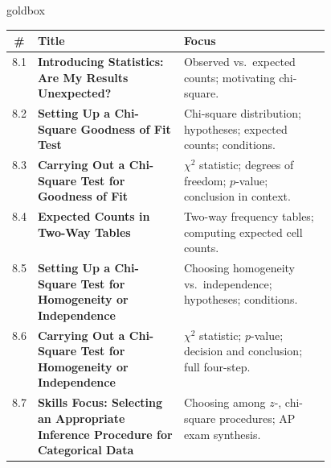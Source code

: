 \documentclass[10pt]{article}
\begin{document}
\renewcommand{\arraystretch}{1.35}
\begin{skillbox}{goldbox}
\small
\begin{tabularx}{\linewidth}{@{} c >{\bfseries}p{0.46\linewidth} X @{}}
  \textbf{\#} & \textbf{Title} & \textbf{Focus} \\
  \hline
  8.1 & Introducing Statistics: Are My Results Unexpected?
      & Observed vs.\ expected counts; motivating chi-square. \\
  \hline
  8.2 & Setting Up a Chi-Square Goodness of Fit Test
      & Chi-square distribution; hypotheses; expected counts; conditions. \\
  \hline
  8.3 & Carrying Out a Chi-Square Test for Goodness of Fit
      & $\chi^2$ statistic; degrees of freedom; $p$-value; conclusion in context. \\
  \hline
  8.4 & Expected Counts in Two-Way Tables
      & Two-way frequency tables; computing expected cell counts. \\
  \hline
  8.5 & Setting Up a Chi-Square Test for Homogeneity or Independence
      & Choosing homogeneity vs.\ independence; hypotheses; conditions. \\
  \hline
  8.6 & Carrying Out a Chi-Square Test for Homogeneity or Independence
      & $\chi^2$ statistic; $p$-value; decision and conclusion; full four-step. \\
  \hline
  8.7 & Skills Focus: Selecting an Appropriate Inference Procedure for Categorical Data
      & Choosing among $z$-, chi-square procedures; AP exam synthesis. \\
  \hline
\end{tabularx}
\end{skillbox}

\vspace{0.12in}
\end{document}
